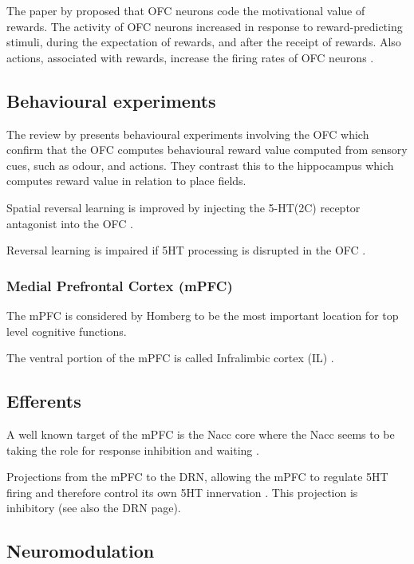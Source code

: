 \documentclass[12pt,a4paper]{article}
\begin{document}
The paper by \citep{Tremblay1999} proposed that OFC neurons code the motivational value of rewards. The activity of OFC neurons increased in response to reward-predicting stimuli, during the expectation of rewards, and after the receipt of rewards. Also actions, associated with rewards, increase the firing rates of OFC neurons \citep{Wikenheiser2016}.

\subsection{Behavioural experiments}

The review by \citep{Wikenheiser2016} presents behavioural experiments involving the OFC which confirm that the OFC computes behavioural reward value computed from sensory cues, such as odour, and actions. They contrast this to the hippocampus which computes reward value in relation to place fields.

Spatial reversal learning is improved by injecting the 5-HT(2C) receptor antagonist into the OFC \citep{Boulougouris2010}. 

Reversal learning is impaired if 5HT processing is disrupted in the OFC \citep{Bari2013}.

\subsubsection{Medial Prefrontal Cortex (mPFC)}

The mPFC is considered by Homberg to be the most important location for top level cognitive
functions. 

The ventral portion of the mPFC is called Infralimbic cortex (IL) \citep{Tsutsui-Kimura2016}.

\subsection{Efferents}

A well known target of the mPFC is the Nacc core where the Nacc seems to be taking the role for response inhibition and waiting \citep{Neufang2016} \citep{Feja2014}.

Projections from the mPFC to the DRN, allowing the mPFC to regulate 5HT firing and therefore control its own 5HT innervation  \citep{Homberg2012}\citep{Juckel1999}. This projection is inhibitory (see also the DRN page).

\subsection{Neuromodulation}
\end{document}
